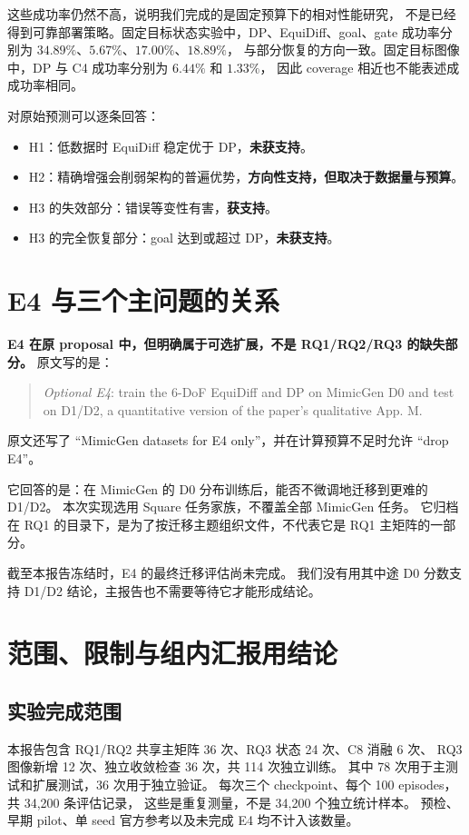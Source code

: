 这些成功率仍然不高，说明我们完成的是固定预算下的相对性能研究，
不是已经得到可靠部署策略。固定目标状态实验中，DP、EquiDiff、goal、gate
成功率分别为 $34.89\%$、$5.67\%$、$17.00\%$、$18.89\%$，
与部分恢复的方向一致。固定目标图像中，DP 与 C4 成功率分别为 $6.44\%$ 和 $1.33\%$，
因此 coverage 相近也不能表述成成功率相同。

对原始预测可以逐条回答：
\begin{itemize}
\item H1：低数据时 EquiDiff 稳定优于 DP，\textbf{未获支持}。
\item H2：精确增强会削弱架构的普遍优势，\textbf{方向性支持，但取决于数据量与预算}。
\item H3 的失效部分：错误等变性有害，\textbf{获支持}。
\item H3 的完全恢复部分：goal 达到或超过 DP，\textbf{未获支持}。
\end{itemize}

\section{E4 与三个主问题的关系}
\label{eqstudy:zh:e4}
\textbf{E4 在原 proposal 中，但明确属于可选扩展，不是 RQ1/RQ2/RQ3 的缺失部分。}
原文写的是：
\begin{quote}
\emph{Optional E4}: train the 6-DoF EquiDiff and DP on MimicGen D0 and test on D1/D2,
a quantitative version of the paper's qualitative App. M.
\end{quote}
原文还写了 ``MimicGen datasets for E4 only''，并在计算预算不足时允许 ``drop E4''。

它回答的是：在 MimicGen 的 D0 分布训练后，能否不微调地迁移到更难的 D1/D2。
本次实现选用 Square 任务家族，不覆盖全部 MimicGen 任务。
它归档在 RQ1 的目录下，是为了按迁移主题组织文件，不代表它是 RQ1 主矩阵的一部分。

截至本报告冻结时，E4 的最终迁移评估尚未完成。
我们没有用其中途 D0 分数支持 D1/D2 结论，主报告也不需要等待它才能形成结论。

\section{范围、限制与组内汇报用结论}
\label{eqstudy:zh:limits}
\subsection{实验完成范围}
本报告包含 RQ1/RQ2 共享主矩阵 36 次、RQ3 状态 24 次、C8 消融 6 次、
RQ3 图像新增 12 次、独立收敛检查 36 次，共 114 次独立训练。
其中 78 次用于主测试和扩展测试，36 次用于独立验证。
每次三个 checkpoint、每个 100 episodes，共 34,200 条评估记录，
这些是重复测量，不是 34,200 个独立统计样本。
预检、早期 pilot、单 seed 官方参考以及未完成 E4 均不计入该数量。

